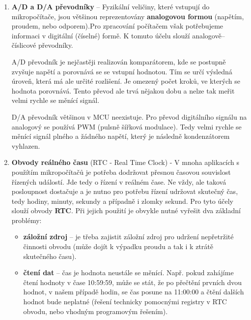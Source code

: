 \begin{enumerate}
\item \textbf{A/D a D/A převodníky} -- Fyzikální veličiny, které vstupují do mikropočítače, jsou většinou reprezentovány
\textbf{analogovou formou} (napětím, proudem, nebo odporem).Pro zpracování počítačem však potřebujeme informaci v digitální (číselné) formě. K tomuto účelu slouží analogově–číslicové převodníky.

A/D převodník je nejčastěji realizován komparátorem, kde se postupně zvyšuje napětí a porovnává se se vstupní hodnotou. Tím se určí výsledná úroveň, která má ale určité rozlišení. Je omezený počet kroků, ve kterých se hodnota porovnává. Tento převod ale trvá nějakou dobu a nelze tak meřit velmi rychle se měnící signál.

D/A převodník většinou v MCU neexistuje. Pro převod digitálního signálu na analogový se používá PWM (pulsně šířková modulace). Tedy velmi rychle se měnící signál plného a žádného napětí, který je následně kondenzátorem vyhlazen.

\item \textbf{Obvody reálného času} (RTC - Real Time Clock) - V mnoha aplikacích s použítím mikropočítačů je potřeba dodržovat přesnou časovou souvislost řízených událostí. Jde tedy o řízení v reálném čase. Ne vždy, ale taková posloupnost dostačuje a je nutno pro potřebu řízení udržovat skutečný čas, tedy hodiny, minuty, sekundy a případně i zlomky sekund. Pro tyto účely slouží obvody \textbf{RTC}. Při jejich použití je obvykle nutné vyřešit dva základní problémy:
\begin{itemize}
\item \textbf{záložní zdroj} -- je třeba zajistit záložní zdroj pro udržení nepřetržité činnosti obvodu (může dojít k výpadku proudu a tak i k ztrátě skutečného času).
\item \textbf{čtení dat} -- čas je hodnota neustále se měnící. Např. pokud zahájíme čtení hodnoty v čase 10:59:59, může se stát, že po přečtění prvních dvou hodnot, v našem případě hodin, se čas posune na 11:00:00 a čtění dalších hodnot bude neplatné (řešení technicky pomocnými registry v RTC obvodu, nebo vhodným programovým řešením). 
\end{itemize}
\end{enumerate}

